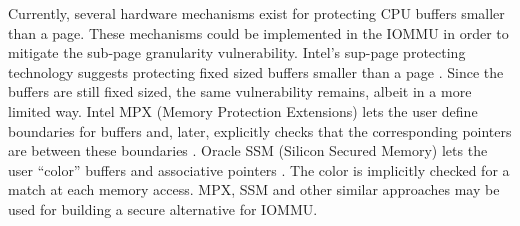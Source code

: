 


Currently, several hardware mechanisms exist for protecting CPU buffers smaller than a page. These mechanisms could be implemented in the IOMMU in order to mitigate the sub-page granularity vulnerability. Intel’s sup-page protecting technology suggests protecting fixed sized buffers smaller than a page \cite{Int18}. Since the buffers are still fixed sized, the same vulnerability remains, albeit in a more limited way. Intel MPX (Memory Protection Extensions) lets the user define boundaries for buffers and, later, explicitly checks that the corresponding pointers are between these boundaries \cite{Int16a}. Oracle SSM (Silicon Secured Memory) lets the user “color” buffers and associative pointers \cite{Ora15}. The color is implicitly checked for a match at each memory access. MPX, SSM and other similar approaches may be used for building a secure alternative for IOMMU. 

